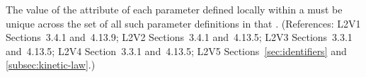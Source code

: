The value of the  attribute of each parameter defined locally within
a \KineticLaw must be unique across the set of all such parameter
definitions in that \KineticLaw.  (References: L2V1 Sections~3.4.1 and~4.13.9;
L2V2 Sections~3.4.1 and~4.13.5; L2V3 Sections~3.3.1 and~4.13.5; L2V4 Section~3.3.1 and~4.13.5;
L2V5 Sections~\ref{sec:identifiers} and \ref{subsec:kinetic-law}.)
